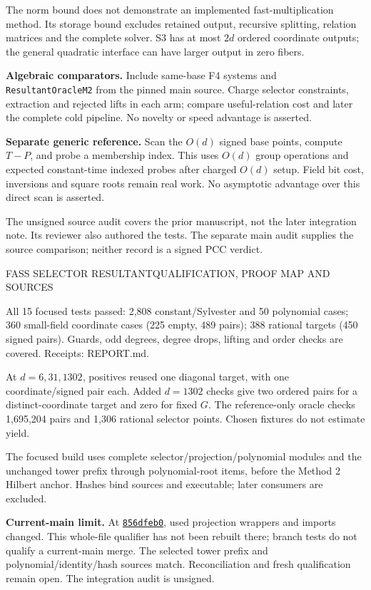 \documentclass[10pt,letterpaper]{article}
\newcommand{\heading}[1]{\vspace{4pt}{\large\bfseries\color{navy}#1}\par\vspace{1pt}}
\newcommand{\mini}[1]{\textbf{\color{teal}#1}}
\begin{document}
The norm bound does not demonstrate an implemented fast-multiplication method. Its storage bound excludes retained output, recursive splitting, relation matrices and the complete solver. S3 has at most $2d$ ordered coordinate outputs; the general quadratic interface can have larger output in zero fibers.

\mini{Algebraic comparators.} Include same-base F4 systems and \texttt{ResultantOracleM2} from the pinned main source. Charge selector constraints, extraction and rejected lifts in each arm; compare useful-relation cost and later the complete cold pipeline. No novelty or speed advantage is asserted.

\mini{Separate generic reference.} Scan the $O(d)$ signed base points, compute $T-P$, and probe a membership index. This uses $O(d)$ group operations and expected constant-time indexed probes after charged $O(d)$ setup. Field bit cost, inversions and square roots remain real work. No asymptotic advantage over this direct scan is asserted.

The unsigned source audit covers the prior manuscript, not the later integration note. Its reviewer also authored the tests. The separate main audit supplies the source comparison; neither record is a signed PCC verdict.

\newpage
\fontsize{10}{12.1}\selectfont
{\small\color{muted}FASS SELECTOR RESULTANT\hfill QUALIFICATION, PROOF MAP AND SOURCES}\par
\heading{6. Qualification and gates}
All 15 focused tests passed: 2,808 constant/Sylvester and 50 polynomial cases; 360 small-field coordinate cases (225 empty, 489 pairs); 388 rational targets (450 signed pairs). Guards, odd degrees, degree drops, lifting and order checks are covered. Receipts: REPORT.md.

At $d=6,31,1302$, positives reused one diagonal target, with one coordinate/signed pair each. Added $d=1302$ checks give two ordered pairs for a distinct-coordinate target and zero for fixed $G$. The reference-only oracle checks 1,695,204 pairs and 1,306 rational selector points. Chosen fixtures do not estimate yield.

The focused build uses complete selector/projection/polynomial modules and the unchanged tower prefix through polynomial-root items, before the Method 2 Hilbert anchor. Hashes bind sources and executable; later consumers are excluded.

\mini{Current-main limit.} At \href{https://github.com/isogeny-labs/crypto/commit/856dfeb0be25df78ab3877741544f64940128fac}{\texttt{856dfeb0}}, used projection wrappers and imports changed. This whole-file qualifier has not been rebuilt there; branch tests do not qualify a current-main merge. The selected tower prefix and polynomial/identity/hash sources match. Reconciliation and fresh qualification remain open. The integration audit is unsigned.
\end{document}
